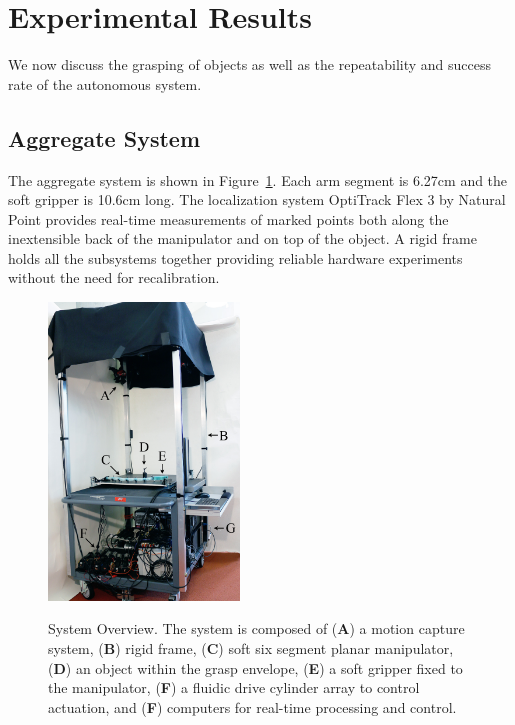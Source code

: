 \section{Experimental Results}
\label{sec:experimental_results}
We now discuss the grasping of objects as well as the repeatability and success rate of the autonomous system.
 
\subsection{Aggregate System}
\label{sec:aggregate_system}
The aggregate  system is shown in Figure~\ref{fig:sys_overview}.
Each arm segment is 6.27\unit{cm} and the soft gripper is 10.6\unit{cm} long.
The localization system OptiTrack Flex 3 by Natural Point provides real-time measurements of marked points both along the inextensible back of the manipulator and on top of the object. 
A rigid frame holds all the subsystems  together providing reliable hardware experiments without the need for recalibration.

\begin{figure}[htbp]
\begin{centering}
  \includegraphics[width=2.0in]{Figures/system_overview/sys_overview_smaller}\\
  \caption{System Overview. The system is composed of (\textbf{A}) a motion capture system, (\textbf{B}) rigid frame, (\textbf{C}) soft six segment planar manipulator, (\textbf{D}) an object within the grasp envelope, (\textbf{E}) a soft gripper fixed to the manipulator, (\textbf{F}) a fluidic drive cylinder array to control actuation, and (\textbf{F}) computers for real-time processing and control.} \label{fig:sys_overview}
\end{centering}
\end{figure}


